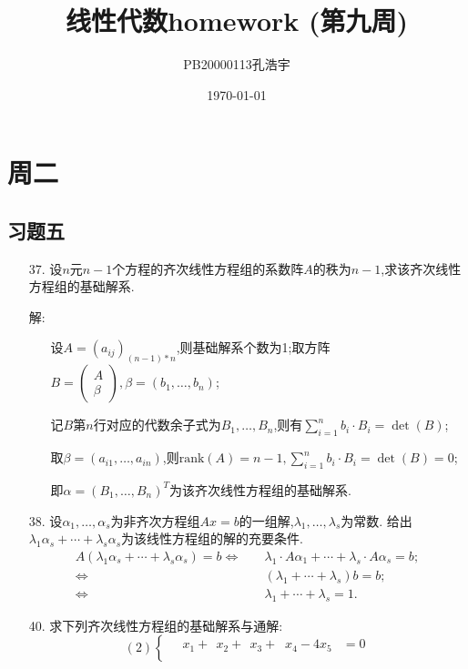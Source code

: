 \documentclass{article}
\title{线性代数homework (第九周)}
\author{PB20000113孔浩宇}
\date{\today}
\begin{document}
\maketitle
\section{周二}
\subsection{习题五}
\begin{enumerate}
    \item [37.]设$n$元$n-1$个方程的齐次线性方程组的系数阵$A$的秩为$n-1$,求该齐次线性方程组的基础解系.
    
    解:
    \begin{enumerate}
        \item []设$A={(a_{ij})}_{(n-1)*n}$,则基础解系个数为1;取方阵$B=\begin{pmatrix}A\\ \beta\end{pmatrix},\beta=(b_1,\ldots,b_n)$;
        \item []记$B$第$n$行对应的代数余子式为$B_1,\ldots,B_n$,则有$\sum\limits_{i=1}^n b_i\cdot B_i=\det(B)$;
        \item []取$\beta=(a_{i1},\ldots,a_{in})$,则$\mbox{rank}(A)=n-1,\sum\limits_{i=1}^n b_i\cdot B_i=\det(B)=0$;
        \item []即$\alpha={(B_1,\ldots,B_n)}^T$为该齐次线性方程组的基础解系.
    \end{enumerate}
    \item [38.]设$\alpha_1,\ldots,\alpha_s$为非齐次方程组$Ax=b$的一组解,$\lambda_1,\ldots,\lambda_s$为常数.
    给出$\lambda_1 \alpha_s+\cdots+\lambda_s \alpha_s$为该线性方程组的解的充要条件.
    \begin{align*}
        A(\lambda_1 \alpha_s+\cdots+\lambda_s \alpha_s)=b
        \Leftrightarrow
        &\quad \lambda_1\cdot A\alpha_1+\cdots+\lambda_s\cdot A\alpha_s=b;\\
        \Leftrightarrow
        &\quad (\lambda_1+\cdots+\lambda_s)b=b;\\
        \Leftrightarrow
        &\quad \lambda_1+\cdots+\lambda_s=1.
    \end{align*}
    \item [40.]求下列齐次线性方程组的基础解系与通解:
    \[
        (2)
        \begin{cases}
            \quad x_1 + \,\;x_2 +\,\; x_3 +\;\; x_4 - 4x_5 &=0\\

\end{cases}\]
\end{enumerate}
\end{document}
